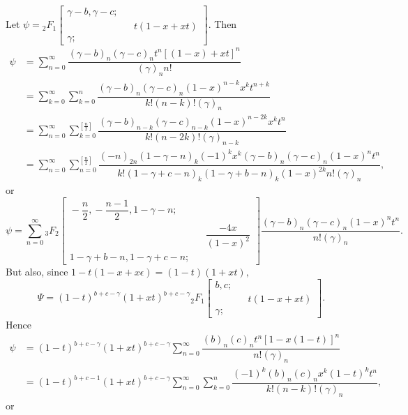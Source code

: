 \begin{solution}
Let $\psi = {}_2F_1 \left[ \begin{array}{rlr}
\gamma - b, \gamma-c; & & \\
& & t(1-x+xt) \\
\gamma; & & 
\end{array} \right].$
Then
$$\begin{array}{ll}
\psi &= \displaystyle\sum_{n=0}^{\infty} \dfrac{(\gamma - b)_n (\gamma - c)_n t^n [(1-x)+xt]^n}{(\gamma)_n n!} \\
&= \displaystyle\sum_{k=0}^{\infty} \displaystyle\sum_{k=0}^{n} \dfrac{(\gamma-b)_n (\gamma-c)_n (1-x)^{n-k}x^k t^{n+k}}{k! (n-k)! (\gamma)_n} \\
&= \displaystyle\sum_{n=0}^{\infty} \displaystyle\sum_{k=0}^{[\frac{n}{2}]} \dfrac{(\gamma-b)_{n-k} (\gamma -c)_{n-k} (1-x)^{n-2k}x^kt^n}{k! (n-2k)! (\gamma)_{n-k}} \\
&= \displaystyle\sum_{n=0}^{\infty} \displaystyle\sum_{n=0}^{[\frac{n}{2}]} \dfrac{(-n)_{2n} (1-\gamma-n)_k (-1)^k x^k (\gamma-b)_n (\gamma-c)_n (1-x)^n t^n}{k! (1-\gamma+c-n)_k (1-\gamma+b-n)_k (1-x)^{2k}n! (\gamma)_n},
\end{array}$$
or
$$\psi\!=\!\displaystyle\sum_{n=0}^{\infty}\!{}_3F_2\!\left[\!\!\! \begin{array}{rlr}
\!-\!\dfrac{n}{2}\!,\!-\dfrac{n-1}{2}\!,\!1\!-\!\gamma\!-\!n; & & \\
& & \dfrac{-4x}{(1-x)^2} \\
\!1\!-\!\gamma\!+\!b\!-\!n\!,\!1\!-\!\gamma\!+\!c\!-\!n\!; & & 
\end{array} \right] \dfrac{(\gamma-b)_n (\gamma-c)_n (1-x)^n t^n}{n! (\gamma)_n}.$$
But also, since $1-t(1-x+x\epsilon) = (1-t)(1+xt),$
$$\Psi = (1-t)^{b+c-\gamma} (1+xt)^{b+c-\gamma} {}_2 F_1 \left[ \begin{array}{rlr}
b, c; & & \\
& & t(1-x+xt) \\
\gamma; & &
\end{array} \right].$$
Hence
$$\begin{array}{ll}
\psi &= (1-t)^{b+c-\gamma} (1+xt)^{b+c-\gamma} \displaystyle\sum_{n=0}^{\infty} \dfrac{(b)_n (c)_n t^n [1-x(1-t)]^n}{n! (\gamma)_n} \\
&= (1-t)^{b+c-1} (1+xt)^{b+c-\gamma} \displaystyle\sum_{n=0}^{\infty} \displaystyle\sum_{k=0}^n \dfrac{(-1)^k (b)_n (c)_n x^k (1-t)^k t^n}{k! (n-k)! (\gamma)_n},
\end{array}$$
or
$$\begin{array}{ll}

\end{array}$$
\end{solution}
